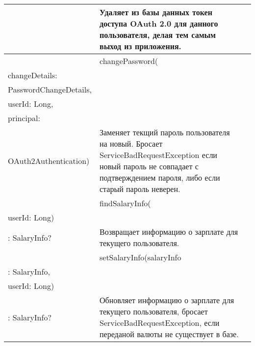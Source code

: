 \begin{center}
\begin{longtable}{ 
      | >{\centering}m{} 
      | >{\centering}m{} 
      | >{\centering\arraybackslash}m{}|}
  	& Удаляет из базы данных токен доступа OAuth 2.0 для данного пользователя, делая тем самым выход из приложения.\\
  \cline{2-3}
  	& changePassword(\\changeDetails: \\PasswordChangeDetails, \\userId: Long, \\principal: \\OAuth2Authentication)
  	& Заменяет текщий пароль пользователя на новый. Бросает \mbox{ServiceBadRequestException} 
  	если новый пароль не совпадает с подтверждением пароля, либо если старый пароль неверен.\\
  \cline{2-3}
  	& findSalaryInfo(\\userId: Long)\\: SalaryInfo?
  	& Возвращает информацию о зарплате для текущего пользователя.\\
  \cline{2-3}
  	& setSalaryInfo(salaryInfo\\: SalaryInfo,\\userId: Long)\\: SalaryInfo?
  	& Обновляет информацию о зарплате для текущего пользователя, бросает \mbox{ServiceBadRequestException}, 
  	если переданой валюты не существует в базе.\\
  \end{longtable}
\end{center}

